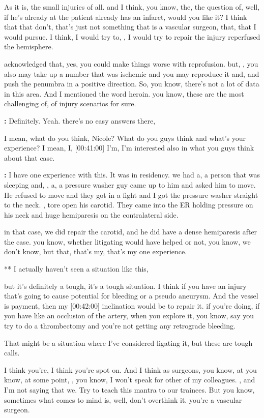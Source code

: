 \documentclass[
]{book}
\begin{document}
As it is, the small injuries of all. and I think, you know, the, the
question of, well, if he's already at the patient already has an
infarct, would you like it? I think that that don't, that's just not
something that is a vascular surgeon, that, that I would pursue. I
think, I would try to, , I would try to repair the injury
reperfused the hemisphere.

acknowledged that, yes, you could make things worse with
reprofusion. but, , you also may take up a number that was ischemic and
you may reproduce it and, and push the penumbra in a positive direction.
So, you know, there's not a lot of data in this area. And I mentioned
the word heroin. you know, these are the most challenging of, of
injury scenarios for sure.

\textbf{:} Definitely. Yeah.
there's no easy answers there,

I mean, what
do you think, Nicole? What do you guys think and what's your experience?
I mean, I, {[}00:41:00{]} I'm, I'm interested also in what you guys think
about that case.

\textbf{:} I have one
experience with this. It was in residency. we had a, a person that
was sleeping and, , a, a pressure washer guy came up to him and asked
him to move. He refused to move and they got in a fight and I got the
pressure washer straight to the neck. , tore open his carotid. They came
into the ER holding pressure on his neck and huge hemiparesis on the
contralateral side.

in that case, we did repair the carotid, and he did have a dense
hemiparesis after the case. you know, whether litigating would have
helped or not, you know, we don't know, but that, that's my, that's my
one experience.

** I actually haven't seen a
situation like this,

but it's definitely a tough, it's a tough situation. I think if you have
an injury that's going to cause potential for bleeding or a pseudo
aneurysm. And the vessel is payment, then my {[}00:42:00{]} inclination
would be to repair it. if you're doing, if you have like an
occlusion of the artery, when you explore it, you know, say you try to
do a thrombectomy and you're not getting any retrograde bleeding.

That might be a situation where I've considered ligating it, but these
are tough calls.

I think
you're, I think you're spot on. And I think as surgeons, you know, at
you know, at some point, , you know, I won't speak for other
of my colleagues. , and I'm not saying that we. Try to teach this mantra
to our trainees. But you know, sometimes what comes to mind is, well,
don't overthink it. you're a vascular surgeon.
\end{document}
